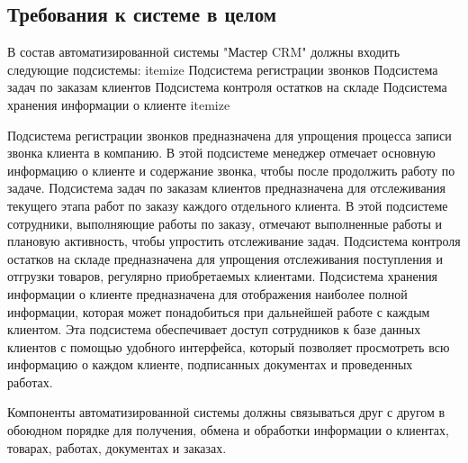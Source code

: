 \documentclass[russian, utf8, 12pt,pointsubsection,floatsubsection]{eskdtext}
\begin{document}
\subsection{Требования к системе в целом}

В состав автоматизированной системы "Мастер CRM" должны входить следующие подсистемы:
itemize
Подсистема регистрации звонков
Подсистема задач по заказам клиентов
Подсистема контроля остатков на складе
Подсистема хранения информации о клиенте
itemize

Подсистема регистрации звонков предназначена для упрощения процесса записи звонка клиента в компанию. В этой подсистеме менеджер отмечает основную информацию о клиенте и содержание звонка, чтобы после продолжить работу по задаче.
Подсистема задач по заказам клиентов предназначена для отслеживания текущего этапа работ по заказу каждого отдельного клиента. В этой подсистеме сотрудники, выполняющие работы по заказу, отмечают выполненные работы и плановую активность, чтобы упростить отслеживание задач.
Подсистема контроля остатков на складе предназначена для упрощения отслеживания поступления и отгрузки товаров, регулярно приобретаемых клиентами.
Подсистема хранения информации о клиенте предназначена для отображения наиболее полной информации, которая может понадобиться при дальнейшей работе с каждым клиентом. Эта подсистема обеспечивает доступ сотрудников к базе данных клиентов с помощью удобного интерфейса, который позволяет просмотреть всю информацию о каждом клиенте, подписанных документах и проведенных работах.


Компоненты автоматизированной системы должны связываться друг с другом в обоюдном порядке для получения, обмена и обработки информации о клиентах, товарах, работах, документах и заказах. 
\end{document}
